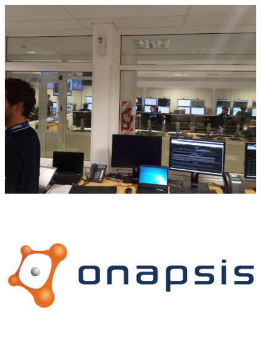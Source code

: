 \documentclass{beamer}
\begin{document}
\begin{frame}
	\begin{figure}
		\centering
		\includegraphics[width=1\linewidth]{images/2}
		\label{fig:UNLAR}
	\end{figure}
\end{frame}

\begin{frame}
	\begin{figure}
		\centering
		\includegraphics[width=1\linewidth]{images/onapsis}
		\label{fig:UNLAR}
	\end{figure}
\end{frame}
\end{document}
